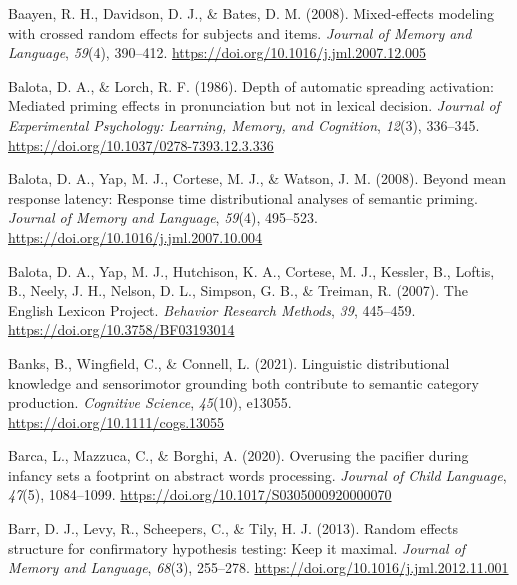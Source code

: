 \documentclass[
  12pt,
  man,floatsintext]{apa7}
\newlength{\cslhangindent}
\newlength{\cslentryspacingunit} %
\newenvironment{CSLReferences}[2] %
 {%
  \setlength{\parindent}{0pt}
  \ifodd #1
  \let\oldpar\par
  \def\par{\hangindent=\cslhangindent\oldpar}
  \fi
  \setlength{\parskip}{#2\cslentryspacingunit}
 }%
 {}
\begin{document}
\begin{CSLReferences}{1}{0}
\leavevmode{}%
Baayen, R. H., Davidson, D. J., \& Bates, D. M. (2008). Mixed-effects modeling with crossed random effects for subjects and items. \emph{Journal of Memory and Language}, \emph{59}(4), 390--412. \url{https://doi.org/10.1016/j.jml.2007.12.005}

\leavevmode{}%
Balota, D. A., \& Lorch, R. F. (1986). Depth of automatic spreading activation: {Mediated} priming effects in pronunciation but not in lexical decision. \emph{Journal of Experimental Psychology: Learning, Memory, and Cognition}, \emph{12}(3), 336--345. \url{https://doi.org/10.1037/0278-7393.12.3.336}

\leavevmode{}%
Balota, D. A., Yap, M. J., Cortese, M. J., \& Watson, J. M. (2008). Beyond mean response latency: {Response} time distributional analyses of semantic priming. \emph{Journal of Memory and Language}, \emph{59}(4), 495--523. \url{https://doi.org/10.1016/j.jml.2007.10.004}

\leavevmode{}%
Balota, D. A., Yap, M. J., Hutchison, K. A., Cortese, M. J., Kessler, B., Loftis, B., Neely, J. H., Nelson, D. L., Simpson, G. B., \& Treiman, R. (2007). The {English Lexicon Project}. \emph{Behavior Research Methods}, \emph{39}, 445--459. \url{https://doi.org/10.3758/BF03193014}

\leavevmode{}%
Banks, B., Wingfield, C., \& Connell, L. (2021). Linguistic distributional knowledge and sensorimotor grounding both contribute to semantic category production. \emph{Cognitive Science}, \emph{45}(10), e13055. \url{https://doi.org/10.1111/cogs.13055}

\leavevmode{}%
Barca, L., Mazzuca, C., \& Borghi, A. (2020). Overusing the pacifier during infancy sets a footprint on abstract words processing. \emph{Journal of Child Language}, \emph{47}(5), 1084--1099. \url{https://doi.org/10.1017/S0305000920000070}

\leavevmode{}%
Barr, D. J., Levy, R., Scheepers, C., \& Tily, H. J. (2013). Random effects structure for confirmatory hypothesis testing: {Keep} it maximal. \emph{Journal of Memory and Language}, \emph{68}(3), 255--278. \url{https://doi.org/10.1016/j.jml.2012.11.001}


\end{CSLReferences}
\end{document}
